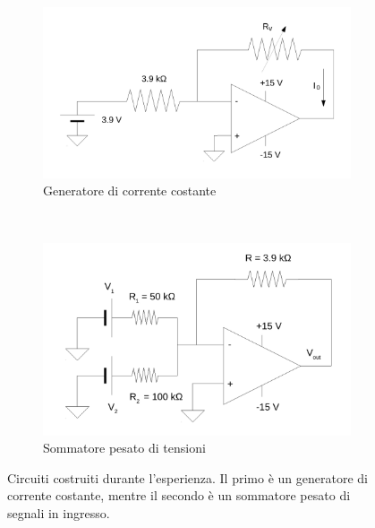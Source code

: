 \begin{figure}[h]
        \centering
        \begin{subfigure}[b]{0.48\textwidth}
                \includegraphics[width=\textwidth]{schema_gen_corr.pdf}
                \caption{Generatore di corrente costante}
                \label{fig:generatore}
        \end{subfigure}
        ~
        \begin{subfigure}[b]{0.48\textwidth}
                \includegraphics[width=\textwidth]{circuito_sommatore.pdf}
                \caption{Sommatore pesato di tensioni}
                \label{fig:sommatore}
        \end{subfigure}
        \caption{Circuiti costruiti durante l'esperienza. Il primo è un generatore di corrente costante, mentre il secondo è un sommatore pesato di segnali in ingresso.}
        \label{fig:circuits}
\end{figure}